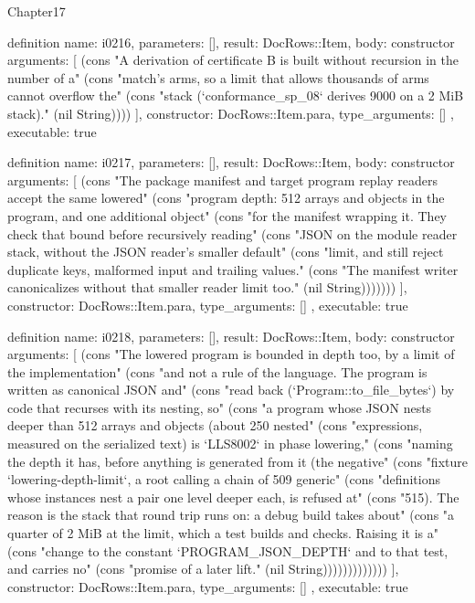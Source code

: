 \begin{lexlean}{Chapter17}
\begin{semanticmodule}
definition{
  name: i0216,
  parameters: [],
  result: DocRows::Item,
  body: constructor{
    arguments: [
      (cons "A derivation of certificate B is built without recursion in the number of a" (cons "match's arms, so a limit that allows thousands of arms cannot overflow the" (cons "stack (`conformance_sp_08` derives 9000 on a 2 MiB stack)." (nil String))))
    ],
    constructor: DocRows::Item.para,
    type_arguments: []
  },
  executable: true
}

definition{
  name: i0217,
  parameters: [],
  result: DocRows::Item,
  body: constructor{
    arguments: [
      (cons "The package manifest and target program replay readers accept the same lowered" (cons "program depth: 512 arrays and objects in the program, and one additional object" (cons "for the manifest wrapping it. They check that bound before recursively reading" (cons "JSON on the module reader stack, without the JSON reader's smaller default" (cons "limit, and still reject duplicate keys, malformed input and trailing values." (cons "The manifest writer canonicalizes without that smaller reader limit too." (nil String)))))))
    ],
    constructor: DocRows::Item.para,
    type_arguments: []
  },
  executable: true
}

definition{
  name: i0218,
  parameters: [],
  result: DocRows::Item,
  body: constructor{
    arguments: [
      (cons "The lowered program is bounded in depth too, by a limit of the implementation" (cons "and not a rule of the language. The program is written as canonical JSON and" (cons "read back (`Program::to_file_bytes`) by code that recurses with its nesting, so" (cons "a program whose JSON nests deeper than 512 arrays and objects (about 250 nested" (cons "expressions, measured on the serialized text) is `LLS8002` in phase lowering," (cons "naming the depth it has, before anything is generated from it (the negative" (cons "fixture `lowering-depth-limit`, a root calling a chain of 509 generic" (cons "definitions whose instances nest a pair one level deeper each, is refused at" (cons "515). The reason is the stack that round trip runs on: a debug build takes about" (cons "a quarter of 2 MiB at the limit, which a test builds and checks. Raising it is a" (cons "change to the constant `PROGRAM_JSON_DEPTH` and to that test, and carries no" (cons "promise of a later lift." (nil String)))))))))))))
    ],
    constructor: DocRows::Item.para,
    type_arguments: []
  },
  executable: true
}


\end{semanticmodule}
\end{lexlean}

